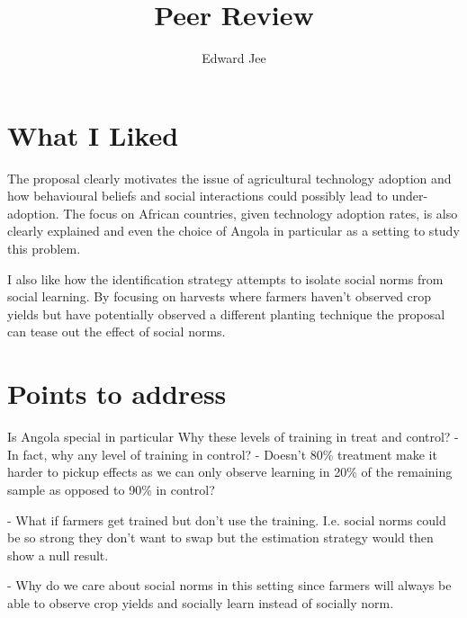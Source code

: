 \documentclass{article}
\title{Peer Review}
\author{Edward Jee}
\begin{document}
\maketitle



\section*{What I Liked}


The proposal clearly motivates the issue of agricultural technology adoption and 
how behavioural beliefs and social interactions could possibly lead to 
under-adoption. The focus on African countries, given technology adoption rates, 
is also clearly explained and even the choice of Angola in particular as a 
setting to study this problem.


I also like how the identification strategy attempts to isolate social norms 
from social learning. By focusing on harvests where farmers haven't observed 
crop yields but have potentially observed a different planting technique the 
proposal can tease out the effect of social norms.

\section*{Points to address}


Is Angola special in particular
Why these levels of training in treat and control? 
- In fact, why any level of training in control?
- Doesn't 80\% treatment make it harder to pickup effects as we can only 
observe learning in 20\% of the remaining sample as opposed to 90\% in control?



- What if farmers get trained but don't use the training. I.e. social norms 
could be so strong they don't want to swap but the estimation strategy would then 
show a null result.

- Why do we care about social norms in this setting since farmers will always be 
able to observe crop yields and socially learn instead of socially norm. 





    
\end{document}
